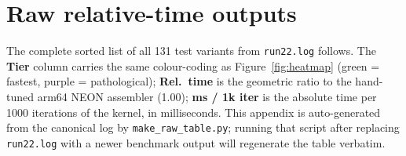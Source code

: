 \documentclass[11pt,a4paper]{article}
\begin{document}
\section{Raw relative-time outputs}
\label{app:raw}

The complete sorted list of all 131 test variants from
\texttt{run22.log} follows. The \textbf{Tier} column carries the
same colour-coding as Figure~\ref{fig:heatmap} (green = fastest,
purple = pathological); \textbf{Rel.\ time} is the geometric ratio
to the hand-tuned arm64 NEON assembler (1.00); \textbf{ms / 1k iter}
is the absolute time per 1000 iterations of the kernel, in
milliseconds. This appendix is auto-generated from the canonical
log by \texttt{make\_raw\_table.py}; running that script after
replacing \texttt{run22.log} with a newer benchmark output will
regenerate the table verbatim.


\end{document}
